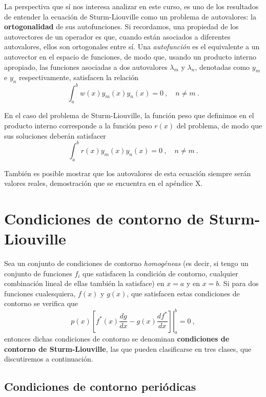La perspectiva que sí nos interesa analizar en este curso, es uno de los resultados de entender la ecuación de Sturm-Liouville como un problema de autovalores: la \textbf{ortogonalidad} de sus autofunciones. Si recordamos, una propiedad de los autovectores de un operador es que, cuando están asociados a diferentes autovalores, ellos son ortogonales entre sí. Una \emph{autofunción} es el equivalente a un autovector en el espacio de funciones, de modo que, usando un producto interno apropiado, las funciones asociadas a dos autovalores $\lambda_m$ y $\lambda_n$, denotadas como $y_m$ e $y_n$ respectivamente, satisfacen la relación
\begin{equation}
    \int_a^b w(x) y_m(x) y_n(x) = 0 \ , \quad n \neq m \ .
\end{equation}

En el caso del problema de Sturm-Liouville, la función peso que definimos en el producto interno corresponde a la función peso $r(x)$ del problema, de modo que sus soluciones deberán satisfacer
\begin{equation}
    \int_a^b r(x) y_m(x) y_n(x) = 0 \ , \quad n \neq m \ .
\end{equation}

También es posible mostrar que los autovalores de esta ecuación siempre serán valores reales, demostración que se encuentra en el apéndice X.

\section{Condiciones de contorno de Sturm-Liouville}

Sea un conjunto de condiciones de contorno \emph{homogéneas} (es decir, si tengo un conjunto de funciones $f_i$ que satisfacen la condición de contorno, cualquier combinación lineal de ellas también la satisface) en $x=a$ y en $x=b$. Si para dos funciones cualesquiera, $f(x)$ y $g(x)$, que satisfacen estas condiciones de contorno se verifica que
\begin{equation} \label{eq:SM-condicion}
    p(x)  \left.  \left[ f^\ast(x) \frac{dg}{dx} - g(x)\frac{df^\ast}{dx} \right]\right|_a^b = 0 \ ,
\end{equation}
entonces dichas condiciones de contorno se denominan \textbf{condiciones de contorno de Sturm-Liouville}, las que pueden clasificarse en tres clases, que discutiremos a continuación.

\subsection{Condiciones de contorno periódicas}

